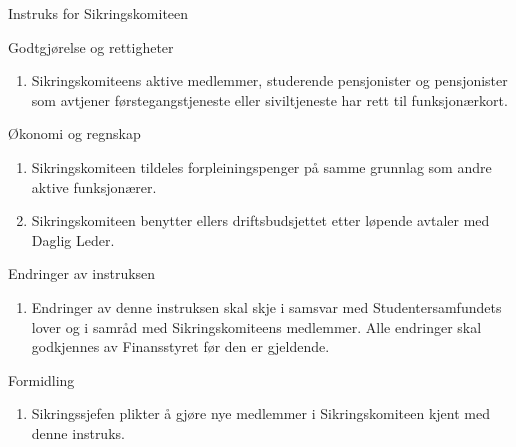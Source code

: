 \begin{instruks*}{Instruks for Sikringskomiteen}
    \begin{instruksledd}{Godtgjørelse og rettigheter}
        \begin{enumerate}
            \item Sikringskomiteens aktive medlemmer, studerende pensjonister og pensjonister som
                avtjener førstegangstjeneste eller siviltjeneste har rett til funksjonærkort.
        \end{enumerate}
    \end{instruksledd}

    \begin{instruksledd}{Økonomi og regnskap}
        \begin{enumerate}
            \item Sikringskomiteen tildeles forpleiningspenger på samme grunnlag som andre aktive
                funksjonærer.
            \item Sikringskomiteen benytter ellers driftsbudsjettet etter løpende avtaler med
                Daglig Leder.
        \end{enumerate}
    \end{instruksledd}

    \begin{instruksledd}{ Endringer av instruksen}
        \begin{enumerate}
            \item Endringer av denne instruksen skal skje i samsvar med Studentersamfundets lover
                og i samråd med
                Sikringskomiteens medlemmer. Alle endringer skal godkjennes av Finansstyret før
                den er gjeldende.
        \end{enumerate}
    \end{instruksledd}

    \begin{instruksledd}{Formidling}
        \begin{enumerate}
            \item Sikringssjefen plikter å gjøre nye medlemmer i Sikringskomiteen kjent med denne
                instruks.
        \end{enumerate}
    \end{instruksledd}

\end{instruks*}






